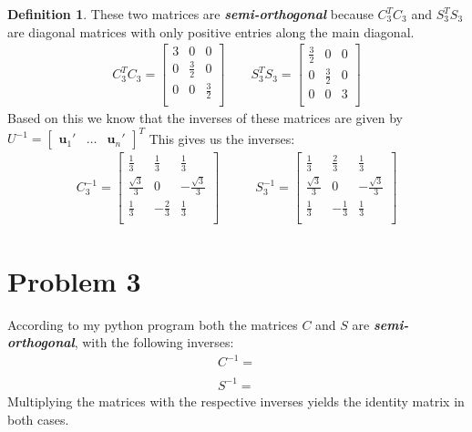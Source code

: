 \documentclass[paper=a4, fontsize=11pt]{scrartcl} %
\numberwithin{equation}{section} %
\numberwithin{figure}{section} %
\numberwithin{table}{section} %
\theoremstyle{definition}
\newtheorem*{definition}{Definition}
\begin{document}
\begin{definition}
These two matrices are \textit{\textbf{semi-orthogonal}} because $C_3^TC_3$ and $S_3^TS_3$ are diagonal matrices with only positive entries along the main diagonal.
\begin{align*}
  C_3^TC_3 = \begin{bmatrix}
	3 & 0 & 0 \\
	0 & \frac{3}{2} & 0 \\
	0 & 0 & \frac{3}{2}\\
  \end{bmatrix} \qquad S_3^TS_3 =
  \begin{bmatrix}
	\frac{3}{2} & 0 & 0 \\
	0 & \frac{3}{2} & 0 \\
	0 & 0 & 3\\
  \end{bmatrix}
\end{align*}
Based on this we know that the inverses of these matrices are given by $U^{-1} = \begin{bmatrix}
  \mathbf{u}_1' & \dots & \mathbf{u}_n'
\end{bmatrix}^T$
This gives us the inverses:
\begin{align*}
  C_3^{-1} = 
 \begin{bmatrix}
   \frac{1}{3} & \frac{1}{3} & \frac{1}{3} \\
   \frac{\sqrt{3}}{3} & 0 &  -\frac{\sqrt{3}}{3} \\
   \frac{1}{3} & -\frac{2}{3} & \frac{1}{3}\\
 \end{bmatrix} \qquad & S_3^{-1} = 
 \begin{bmatrix}
   \frac{1}{3} & \frac{2}{3} & \frac{1}{3}\\
   \frac{\sqrt{3}}{3} & 0 & -\frac{\sqrt{3}}{3}\\
   \frac{1}{3} & -\frac{1}{3} & \frac{1}{3}\\
 \end{bmatrix}
\end{align*}

\section*{Problem 3}
According to my python program both the matrices $C$ and $S$ are \textit{\textbf{semi-orthogonal}}, with the following inverses:
\begin{align*}
  C^{-1} = \\
  \\
  S^{-1} = 
\end{align*}
Multiplying the matrices with the respective inverses yields the identity matrix in both cases.


\end{definition}
\end{document}
